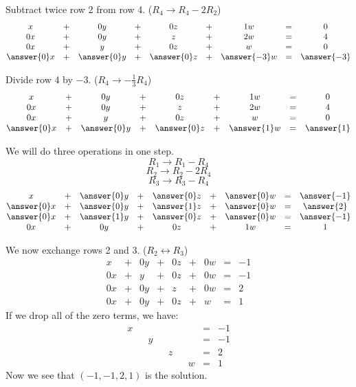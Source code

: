 \documentclass{ximera}
\begin{document}
\begin{exploration}
\begin{prompt} Subtract twice row 2 from row 4. ($R_4\rightarrow R_4-2R_2$)
$$\begin{matrix}
      x &+ &0y&+&0z&+&1w&= &0 \\
     0x& +&0y&+&z&+&2w&=&4\\
     0x& +&y&+&0z&+&w&=&0\\
     \answer{0}x&+&\answer{0}y&+& \answer{0}z&+& \answer{-3}w&=& \answer{-3}
    \end{matrix}$$
\end{prompt}

\begin{prompt} Divide row 4 by $-3$. ($R_4\rightarrow -\frac{1}{3}R_4$)
$$\begin{matrix}
      x &+ &0y&+&0z&+&1w&= &0 \\
     0x& +&0y&+&z&+&2w&=&4\\
     0x& +&y&+&0z&+&w&=&0\\
     \answer{0}x&+&\answer{0}y&+&\answer{0}z&+& \answer{1}w&=&\answer{1}
    \end{matrix}$$
\end{prompt}   

\begin{prompt} We will do three operations in one step.
$$R_1\rightarrow R_1-R_4$$
$$R_2\rightarrow R_2-2R_4$$
$$R_3\rightarrow R_3-R_4$$
$$\begin{matrix}
      x &+ &\answer{0}y&+&\answer{0}z&+& \answer{0}w&= & \answer{-1} \\
     \answer{0}x& +&\answer{0}y&+&\answer{1}z&+& \answer{0}w&=& \answer{2}\\
     \answer{0}x& +&\answer{1}y&+&\answer{0}z&+& \answer{0}w&=& \answer{-1}\\
     0x&+&0y&+&0z&+&1w&=&1
    \end{matrix}$$
\end{prompt}   

We now exchange rows 2 and 3. ($R_2\leftrightarrow R_3$)
\begin{equation}\label{eq:sys20rref1}
\begin{array}{ccccccccc}
      x &+ &0y&+&0z&+&0w&= &-1 \\
   0x& +&y&+&0z&+&0w&=&-1\\
   0x& +&0y&+&z&+&0w&=&2\\
     0x&+&0y&+&0z&+&w&=&1
    \end{array}
    \end{equation}
    If we drop all of the zero terms, we have:
    \begin{equation}\label{eq:sys20rrefnozeros}
    \begin{array}{ccccccccc}
      x & &&&&&&= &-1 \\
   & &y&&&&&=&-1\\
   & &&&z&&&=&2\\
     &&&&&&w&=&1
    \end{array}
    \end{equation}
Now we see that $(-1, -1, 2, 1)$ is the solution.
\end{exploration}
 
\end{document}
